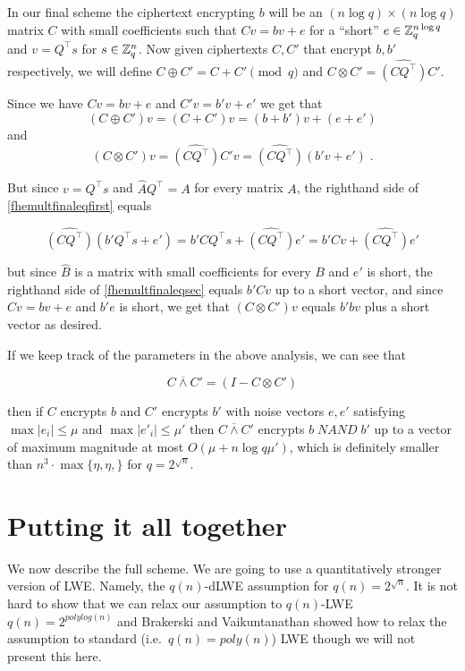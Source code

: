 In our final scheme the ciphertext encrypting \(b\) will be an
\((n\log q)\times (n\log q)\) matrix \(C\) with small coefficients such
that \(Cv =bv + e\) for a ``short'' \(e \in {\mathbb{Z}}_q^{n\log q}\) and
\(v=Q^\top s\) for \(s\in{\mathbb{Z}}_q^n\). Now given ciphertexts \(C,C'\) that
encrypt \(b,b'\) respectively, we will define
\(C \oplus C' = C + C' \pmod{q}\) and
\(C \otimes C' = \widehat{(\ensuremath{\mathit{CQ}}^\top)}C'\).

Since we have \(Cv = bv + e\) and \(C'v = b'v + e'\) we get that
\[(C\oplus C')v = (C+C')v = (b+b')v + (e+e') \label{eqfheaddfinal}\] and
\[(C\otimes C')v = \widehat{(\ensuremath{\mathit{CQ}}^\top)}C'v = \widehat{(\ensuremath{\mathit{CQ}}^\top)}(b'v+e') \;. \label{fhemultfinaleqfirst}\]

But since \(v=Q^\top s\) and \(\hat{A}Q^\top = A\) for every matrix
\(A\), the righthand side of \eqref{fhemultfinaleqfirst} equals

\[\widehat{(\ensuremath{\mathit{CQ}}^\top)}(b'Q^\top s+e')=b'C Q^\top s+\widehat{(\ensuremath{\mathit{CQ}}^\top)}e' = b'Cv + \widehat{(\ensuremath{\mathit{CQ}}^\top)}e' \label{fhemultfinaleqsec}\]

but since \(\widehat{B}\) is a matrix with small coefficients for every
\(B\) and \(e'\) is short, the righthand side of
\eqref{fhemultfinaleqsec} equals \(b'Cv\) up to a short vector, and
since \(Cv=bv+e\) and \(b'e\) is short, we get that \((C\otimes C')v\)
equals \(b'bv\) plus a short vector as desired.

If we keep track of the parameters in the above analysis, we can see
that

\[C \overline{\wedge} C' = (I - C \otimes C')\]

then if \(C\) encrypts \(b\) and \(C'\) encrypts \(b'\) with noise
vectors \(e,e'\) satisfying \(\max |e_i| \leq \mu\) and
\(\max |e'_i| \leq \mu'\) then \(C \overline{\wedge} C'\) encrypts
\(b \; \ensuremath{\mathit{NAND}}\; b'\) up to a vector of maximum
magnitude at most \(O(\mu + n\log q \mu')\), which is definitely smaller
than \(n^3\cdot \max\{\eta,\eta,\}\) for \(q=2^{\sqrt{n}}\).

\section{Putting it all together}\label{Putting-it-all-together}

We now describe the full scheme. We are going to use a quantitatively
stronger version of LWE. Namely, the \(q(n)\)-dLWE assumption for
\(q(n)=2^{\sqrt{n}}\). It is not hard to show that we can relax our
assumption to \(q(n)\)-LWE \(q(n)=2^{polylog(n)}\) and Brakerski and
Vaikuntanathan showed how to relax the assumption to standard
(i.e.~\(q(n)=poly(n)\)) LWE though we will not present this here.

